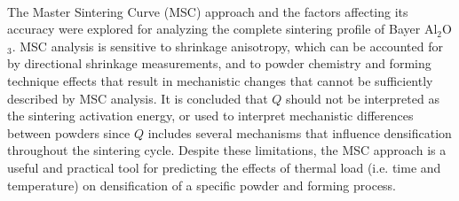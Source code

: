 \paragraph*{} The Master Sintering Curve (MSC) approach and the factors affecting its accuracy were explored for analyzing the complete sintering profile of Bayer Al$_{2}$O$_{3}$. MSC analysis is sensitive to shrinkage anisotropy, which can be accounted for by directional shrinkage measurements, and to powder chemistry and forming technique effects that result in mechanistic changes that cannot be sufficiently described by MSC analysis. It is concluded that $Q$ should not be interpreted as the sintering activation energy, or used to interpret mechanistic differences between powders since $Q$ includes several mechanisms that influence densification throughout the sintering cycle. Despite these limitations, the MSC approach is a useful and practical tool for predicting the effects of thermal load (i.e. time and temperature) on densification of a specific powder and forming process. 